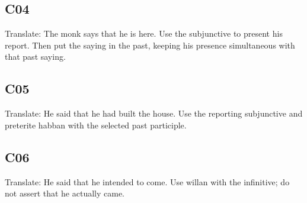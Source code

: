 \subsection*{C04}

\par\begin{minipage}{\linewidth}\raggedright
Translate: The monk says that he is here. Use the subjunctive to present his report. Then put the saying in the past, keeping his presence simultaneous with that past saying.

\end{minipage}\par\addvspace{4pt}

\subsection*{C05}

\par\begin{minipage}{\linewidth}\raggedright
Translate: He said that he had built the house. Use the reporting subjunctive and preterite habban with the selected past participle.

\end{minipage}\par\addvspace{4pt}

\subsection*{C06}

\par\begin{minipage}{\linewidth}\raggedright
Translate: He said that he intended to come. Use willan with the infinitive; do not assert that he actually came.

\end{minipage}\par\addvspace{4pt}


